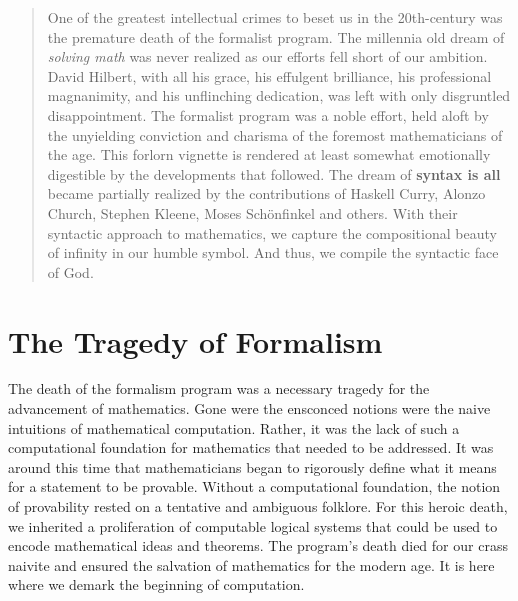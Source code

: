 \maketitle
\pagebreak

\begin{abstract}
    One of the greatest intellectual crimes to beset us in the 20th-century was
    the premature death of the formalist program. The millennia old dream of
    \textit{solving math} was never realized as our efforts fell short of our
    ambition. David Hilbert, with all his grace, his effulgent brilliance, his
    professional magnanimity, and his unflinching dedication, was left with only
    disgruntled disappointment. The formalist program was a noble effort, held
    aloft by the unyielding conviction and charisma of the foremost
    mathematicians of the age. This forlorn vignette is rendered at least
    somewhat emotionally digestible by the developments that followed. The dream
    of \textbf{syntax is all} became partially realized by the contributions of Haskell
    Curry, Alonzo Church, Stephen Kleene, Moses Schönfinkel and others. With
    their syntactic approach to mathematics, we capture the compositional beauty
    of infinity in our humble symbol. And thus, we compile the syntactic face of God.
\end{abstract}
\pagebreak
\tableofcontents
\pagebreak

\section{The Tragedy of Formalism}
The death of the formalism program was a necessary tragedy for the advancement
of mathematics. Gone were the ensconced notions were the naive intuitions of
mathematical computation. Rather, it was the lack of such a computational
foundation for mathematics that needed to be addressed. It was around this time
that mathematicians began to rigorously define what it means for a statement to
be provable. Without a computational foundation, the notion of provability
rested on a tentative and ambiguous folklore. For this heroic death, we
inherited a proliferation of computable logical systems that could be used to
encode mathematical ideas and theorems. The program's death died for our crass
naivite and ensured the salvation of mathematics for the modern age. It is here
where we demark the beginning of computation.


